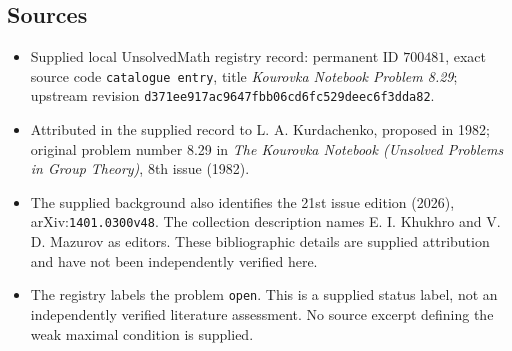 \documentclass[11pt]{article}
\begin{document}
\subsection{Sources}
\begin{itemize}
\item Supplied local UnsolvedMath registry record: permanent ID \(700481\), exact source code \texttt{catalogue entry}, title \emph{Kourovka Notebook Problem 8.29}; upstream revision \texttt{d371ee917ac9647fbb06cd6fc529deec6f3dda82}.
\item Attributed in the supplied record to L. A. Kurdachenko, proposed in 1982; original problem number 8.29 in \emph{The Kourovka Notebook (Unsolved Problems in Group Theory)}, 8th issue (1982).
\item The supplied background also identifies the 21st issue edition (2026), arXiv:\texttt{1401.0300v48}. The collection description names E. I. Khukhro and V. D. Mazurov as editors. These bibliographic details are supplied attribution and have not been independently verified here.
\item The registry labels the problem \texttt{open}. This is a supplied status label, not an independently verified literature assessment. No source excerpt defining the weak maximal condition is supplied.
\end{itemize}
\end{document}
